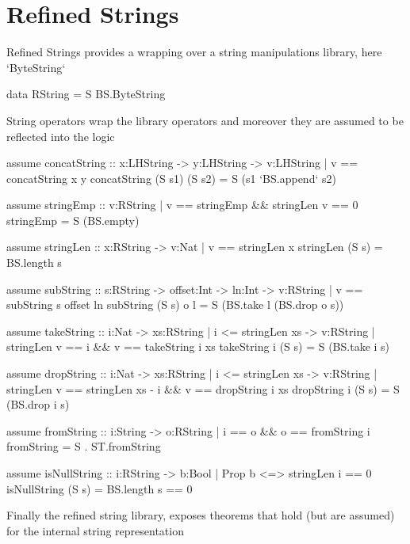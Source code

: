 \section{Refined Strings}\label{sec:strings}

Refined Strings provides a wrapping over a string manipulations library, 
here `ByteString`
\begin{code}
data RString = S BS.ByteString 
\end{code}

String operators wrap the library operators
and moreover they are assumed to be reflected into the logic

\begin{code}
assume concatString :: x:LHString -> y:LHString 
      -> {v:LHString | v == concatString x y }
concatString (S s1) (S s2) = S (s1 `BS.append` s2)

assume stringEmp :: {v:RString | v == stringEmp  && stringLen v == 0 } 
stringEmp = S (BS.empty)

assume stringLen :: x:RString -> {v:Nat | v == stringLen x}
stringLen (S s) = BS.length s 

assume subString  :: s:RString -> offset:Int -> ln:Int -> {v:RString | v == subString s offset ln }
subString (S s) o l = S (BS.take l (BS.drop o s))

assume takeString :: i:Nat -> xs:{RString | i <= stringLen xs } 
  -> {v:RString | stringLen v == i && v == takeString i xs }
takeString i (S s) = S (BS.take i s)

assume dropString :: i:Nat -> xs:{RString | i <= stringLen xs } 
  -> {v:RString | stringLen v == stringLen xs - i && v == dropString i xs }
dropString i (S s) = S (BS.drop i s)

assume fromString :: i:String -> {o:RString | i == o && o == fromString i}
fromString = S . ST.fromString 

assume isNullString :: i:RString -> {b:Bool | Prop b <=> stringLen i == 0 }
isNullString (S s) = BS.length s == 0 
\end{code}


Finally the refined string library, exposes theorems that hold (but are assumed) 
for the internal string representation

